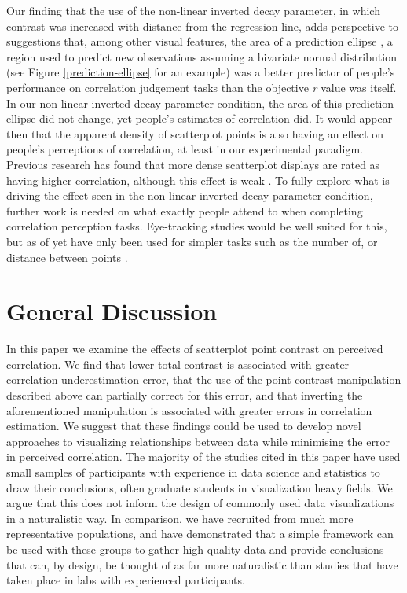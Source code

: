 \documentclass[preprint, 3p,
authoryear]{elsarticle} %
\begin{document}
Our finding that the use of the non-linear inverted decay parameter, in
which contrast was increased with distance from the regression line,
adds perspective to suggestions \citep{yang_2019} that, among other
visual features, the area of a prediction ellipse
\citep{yang_2019, cleveland_1982}, a region used to predict new
observations assuming a bivariate normal distribution (see Figure
\ref{prediction-ellipse} for an example) was a better predictor of
people's performance on correlation judgement tasks than the objective
\emph{r} value was itself. In our non-linear inverted decay parameter
condition, the area of this prediction ellipse did not change, yet
people's estimates of correlation did. It would appear then that the
apparent density of scatterplot points is also having an effect on
people's perceptions of correlation, at least in our experimental
paradigm. Previous research has found that more dense scatterplot
displays are rated as having higher correlation, although this effect is
weak \citep{lauer_1989, rensink_2014}. To fully explore what is driving
the effect seen in the non-linear inverted decay parameter condition,
further work is needed on what exactly people attend to when completing
correlation perception tasks. Eye-tracking studies would be well suited
for this, but as of yet have only been used for simpler tasks such as
the number of, or distance between points \citep{netzel_2017}.

\hypertarget{general-discussion}{%
\section{General Discussion}\label{general-discussion}}

In this paper we examine the effects of scatterplot point contrast on
perceived correlation. We find that lower total contrast is associated
with greater correlation underestimation error, that the use of the
point contrast manipulation described above can partially correct for
this error, and that inverting the aforementioned manipulation is
associated with greater errors in correlation estimation. We suggest
that these findings could be used to develop novel approaches to
visualizing relationships between data while minimising the error in
perceived correlation. The majority of the studies cited in this paper
have used small samples of participants with experience in data science
and statistics to draw their conclusions, often graduate students in
visualization heavy fields. We argue that this does not inform the
design of commonly used data visualizations in a naturalistic way. In
comparison, we have recruited from much more representative populations,
and have demonstrated that a simple framework can be used with these
groups to gather high quality data and provide conclusions that can, by
design, be thought of as far more naturalistic than studies that have
taken place in labs with experienced participants.
\end{document}
